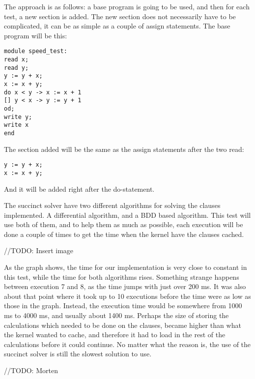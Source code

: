 The approach is as follows: a base program is going to be used, and then for each test, a new section is added. The new section does not necessarily have to be complicated, it can be as simple as a couple of assign statements. The base program will be this:
\begin{lstlisting}
module speed_test:
read x;
read y;
y := y + x;
x := x + y;
do x < y -> x := x + 1
[] y < x -> y := y + 1
od;
write y;
write x
end
\end{lstlisting}
The section added will be the same as the assign statements after the two read:
\begin{lstlisting}
y := y + x;
x := x + y;
\end{lstlisting}
And it will be added right after the do-statement.

The succinct solver have two different algorithms for solving the clauses implemented. A differential algorithm, and a BDD based algorithm. This test will use both of them, and to help them as much as possible, each execution will be done a couple of times to get the time when the kernel have the clauses cached.

//TODO: Insert image

As the graph shows, the time for our implementation is very close to constant in this test, while the time for both algorithms rises. Something strange happens between execution 7 and 8, as the time jumps with just over 200 ms. It was also about that point where it took up to 10 executions before the time were as low as those in the graph. Instead, the execution time would be somewhere from 1000 ms to 4000 ms, and usually about 1400 ms. Perhaps the size of storing the calculations which needed to be done on the clauses, became higher than what the kernel wanted to cache, and therefore it had to load in the rest of the calculations before it could continue. No matter what the reason is, the use of the succinct solver is still the slowest solution to use.

//TODO: Morten

